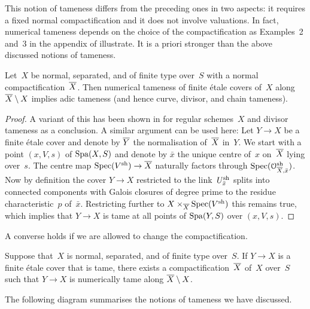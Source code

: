 This notion of tameness differs from the preceding ones in two aspects: it requires a fixed normal compactification and it does not involve valuations.
In fact, numerical tameness depends on the choice of the compactification as Examples~2 and~3 in the appendix of \cite{KerzSchmidt2010:DifferentNotionsTameness} illustrate.
It is a priori stronger than the above discussed notions of tameness.

\begin{prop} \label{numerical-implies-tame}
    Let~$X$ be normal, separated, and of finite type over~$S$ with a normal compactification~$\overline{X}$.
    Then numerical tameness of finite étale covers of~$X$ along $\overline{X} \setminus X$ implies adic tameness (and hence curve, divisor, and chain tameness).
\end{prop}

\begin{proof}
    A variant of this has been shown in \cite[Theorem~5.3]{KerzSchmidt2010:DifferentNotionsTameness} for regular schemes~$X$ and divisor tameness as a conclusion.
    A similar argument can be used here:
    Let $Y \to X$ be a finite étale cover and denote by $\overline{Y}$ the normalisation of~$\overline{X}$ in~$Y$.
    We start with a point $(x,V,s)$ of $\operatorname{Spa}(X,S)$ and denote by $\bar{x}$ the unique centre of~$x$ on~$\overline{X}$ lying over~$s$.
    The centre map $\operatorname{Spec}(V^{\rm sh} )\to \overline{X}$ naturally factors through $\operatorname{Spec}({\mathcal O}_{\overline{X},\bar{x}}^{\rm sh})$.
    Now by definition the cover $Y \to X$ restricted to the link~$U_{\bar x}^{{\rm sh}}$ splits into connected components with Galois closures of degree prime to the residue characteristic~$p$ of~$\bar{x}$.
    Restricting further to $X \times_{\overline{X}} \operatorname{Spec}(V^{\rm sh})$ this remains true, which implies that $Y \to X$ is tame at all points of $\operatorname{Spa}(Y,S)$ over $(x,V,s)$.
\end{proof}

A converse holds if we are allowed to change the compactification.

\begin{prop}
    Suppose that~$X$ is normal, separated, and of finite type over~$S$.
    If $Y \to X$ is a finite étale cover that is tame, there exists a compactification~$\overline{X}$ of~$X$ over~$S$ such that $Y \to X$ is numerically tame along $\overline{X} \setminus X$.
\end{prop}

The following diagram summarises the notions of tameness we have discussed.

